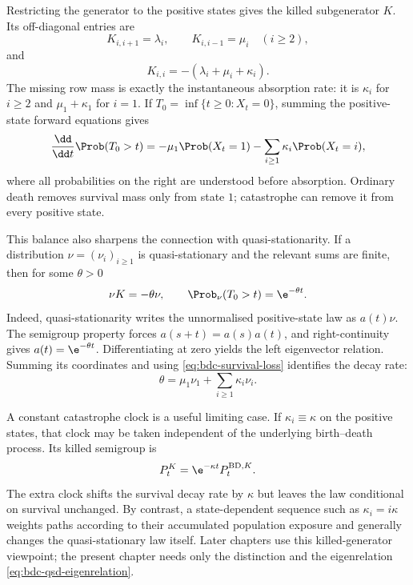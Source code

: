 Restricting the generator to the positive states gives the killed subgenerator
\(K\).  Its off-diagonal entries are
\begin{equation}
  K_{i,i+1}=\lambda_i,
  \qquad
  K_{i,i-1}=\mu_i\quad(i\geq2),
\end{equation}
and
\begin{equation}
  K_{i,i}=-(\lambda_i+\mu_i+\kappa_i).
  \label{eq:bdc-subgenerator}
\end{equation}
The missing row mass is exactly the instantaneous absorption rate: it is
\(\kappa_i\) for \(i\geq2\) and \(\mu_1+\kappa_1\) for \(i=1\).  If
\(T_0=\inf\{t\geq0:X_t=0\}\), summing the positive-state forward equations gives
\begin{equation}
  \frac{\dd}{\dd t}\Prob(T_0>t)
  =
  -\mu_1\Prob(X_t=1)
  -\sum_{i\geq1}\kappa_i\Prob(X_t=i),
  \label{eq:bdc-survival-loss}
\end{equation}
where all probabilities on the right are understood before absorption.  Ordinary
death removes survival mass only from state \(1\); catastrophe can remove it from
every positive state.

This balance also sharpens the connection with quasi-stationarity.  If a
distribution \(\nu=(\nu_i)_{i\geq1}\) is quasi-stationary and the relevant sums are
finite, then for some \(\theta>0\)
\begin{equation}
  \nu K=-\theta\nu,
  \qquad
  \Prob_\nu(T_0>t)=\e^{-\theta t}.
  \label{eq:bdc-qsd-eigenrelation}
\end{equation}
Indeed, quasi-stationarity writes the unnormalised positive-state law as
\(a(t)\nu\).  The semigroup property forces \(a(s+t)=a(s)a(t)\), and
right-continuity gives \(a(t)=\e^{-\theta t}\).  Differentiating at zero yields the
left eigenvector relation.  Summing its coordinates and using
\cref{eq:bdc-survival-loss} identifies the decay rate:
\begin{equation}
  \theta
  =\mu_1\nu_1+\sum_{i\geq1}\kappa_i\nu_i.
  \label{eq:bdc-qsd-decay-rate}
\end{equation}

A constant catastrophe clock is a useful limiting case.  If
\(\kappa_i\equiv\kappa\) on the positive states, that clock may be taken independent
of the underlying birth--death process.  Its killed semigroup is
\begin{equation}
  P_t^{K}=\e^{-\kappa t}P_t^{\mathrm{BD},K}.
  \label{eq:constant-catastrophe-semigroup}
\end{equation}
The extra clock shifts the survival decay rate by \(\kappa\) but leaves the law
conditional on survival unchanged.  By contrast, a state-dependent sequence such
as \(\kappa_i=i\kappa\) weights paths according to their accumulated population
exposure and generally changes the quasi-stationary law itself.  Later chapters use
this killed-generator viewpoint; the present chapter needs only the distinction and
the eigenrelation \cref{eq:bdc-qsd-eigenrelation}.

\FloatBarrier

